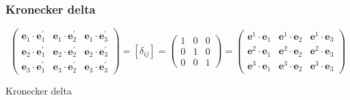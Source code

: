 \documentclass[
]{book}
\theoremstyle{definition}
\theoremstyle{definition}
\theoremstyle{definition}
\theoremstyle{definition}
\theoremstyle{remark}
\begin{document}
\subsubsection{Kronecker delta}\label{kronecker-delta}

\[
\begin{pmatrix}\boldsymbol{e}_{{\scriptscriptstyle 1}}\cdot\boldsymbol{e}_{{\scriptscriptstyle 1}}^{\prime} & \boldsymbol{e}_{{\scriptscriptstyle 1}}\cdot\boldsymbol{e}_{{\scriptscriptstyle 2}}^{\prime} & \boldsymbol{e}_{{\scriptscriptstyle 1}}\cdot\boldsymbol{e}_{{\scriptscriptstyle 3}}^{\prime}\\
\boldsymbol{e}_{{\scriptscriptstyle 2}}\cdot\boldsymbol{e}_{{\scriptscriptstyle 1}}^{\prime} & \boldsymbol{e}_{{\scriptscriptstyle 2}}\cdot\boldsymbol{e}_{{\scriptscriptstyle 2}}^{\prime} & \boldsymbol{e}_{{\scriptscriptstyle 2}}\cdot\boldsymbol{e}_{{\scriptscriptstyle 3}}^{\prime}\\
\boldsymbol{e}_{{\scriptscriptstyle 3}}\cdot\boldsymbol{e}_{{\scriptscriptstyle 1}}^{\prime} & \boldsymbol{e}_{{\scriptscriptstyle 3}}\cdot\boldsymbol{e}_{{\scriptscriptstyle 2}}^{\prime} & \boldsymbol{e}_{{\scriptscriptstyle 3}}\cdot\boldsymbol{e}_{{\scriptscriptstyle 3}}^{\prime}
\end{pmatrix}=\left[\delta_{{\scriptscriptstyle ij}}\right]=\begin{pmatrix}1 & 0 & 0\\
0 & 1 & 0\\
0 & 0 & 1
\end{pmatrix}=\begin{pmatrix}\boldsymbol{e}^{{\scriptscriptstyle 1}}\cdot\boldsymbol{e}_{{\scriptscriptstyle 1}} & \boldsymbol{e}^{{\scriptscriptstyle 1}}\cdot\boldsymbol{e}_{{\scriptscriptstyle 2}} & \boldsymbol{e}^{{\scriptscriptstyle 1}}\cdot\boldsymbol{e}_{{\scriptscriptstyle 3}}\\
\boldsymbol{e}^{{\scriptscriptstyle 2}}\cdot\boldsymbol{e}_{{\scriptscriptstyle 1}} & \boldsymbol{e}^{{\scriptscriptstyle 2}}\cdot\boldsymbol{e}_{{\scriptscriptstyle 2}} & \boldsymbol{e}^{{\scriptscriptstyle 2}}\cdot\boldsymbol{e}_{{\scriptscriptstyle 3}}\\
\boldsymbol{e}^{{\scriptscriptstyle 3}}\cdot\boldsymbol{e}_{{\scriptscriptstyle 1}} & \boldsymbol{e}^{{\scriptscriptstyle 3}}\cdot\boldsymbol{e}_{{\scriptscriptstyle 2}} & \boldsymbol{e}^{{\scriptscriptstyle 3}}\cdot\boldsymbol{e}_{{\scriptscriptstyle 3}}
\end{pmatrix}
\]

Kronecker delta
\end{document}
